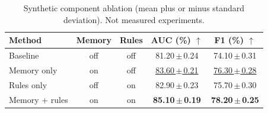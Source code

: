\begin{table}[t]
\centering
\caption{Synthetic component ablation (mean plus or minus standard deviation). Not measured experiments.}
\label{tab:demo-ablation}
\begin{tabular}{@{}lcccc@{}}
\toprule
Method & Memory & Rules & AUC (\%) $\uparrow$ & F1 (\%) $\uparrow$ \\
\midrule
Baseline & off & off & 81.20\,$\pm$\,0.24 & 74.10\,$\pm$\,0.31 \\
Memory only & on & off & \underline{83.60\,$\pm$\,0.21} & \underline{76.30\,$\pm$\,0.28} \\
Rules only & off & on & 82.90\,$\pm$\,0.23 & 75.70\,$\pm$\,0.30 \\
Memory + rules & on & on & \textbf{85.10\,$\pm$\,0.19} & \textbf{78.20\,$\pm$\,0.25} \\
\bottomrule
\end{tabular}
\end{table}
